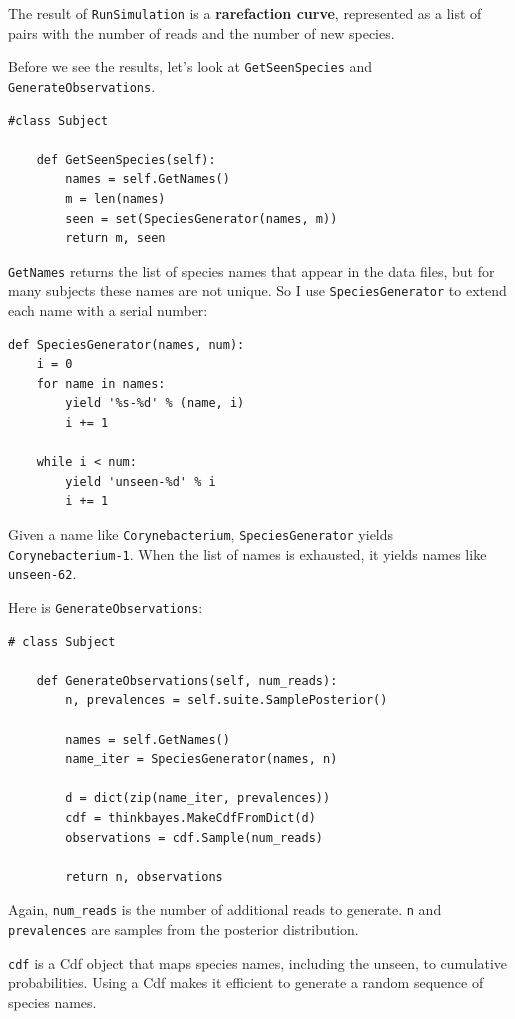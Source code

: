 \documentclass[12pt]{book}
\begin{document}
The result of {\tt RunSimulation} is a {\bf rarefaction curve},
represented as a list of pairs with the number of reads and
the number of new species.

Before we see the results, let's look at {\tt GetSeenSpecies} and
{\tt GenerateObservations}.

\begin{verbatim}
#class Subject

    def GetSeenSpecies(self):
        names = self.GetNames()
        m = len(names)
        seen = set(SpeciesGenerator(names, m))
        return m, seen
\end{verbatim}

{\tt GetNames} returns the list of species names that appear in
the data files, but for many subjects these names are not unique.
So I use {\tt SpeciesGenerator} to extend each name with a serial
number:

\begin{verbatim}
def SpeciesGenerator(names, num):
    i = 0
    for name in names:
        yield '%s-%d' % (name, i)
        i += 1

    while i < num:
        yield 'unseen-%d' % i
        i += 1
\end{verbatim}

Given a name like {\tt Corynebacterium}, {\tt SpeciesGenerator} yields
{\tt Corynebacterium-1}.  When the list of names is exhausted, it
yields names like {\tt unseen-62}.

Here is {\tt GenerateObservations}:

\begin{verbatim}
# class Subject

    def GenerateObservations(self, num_reads):
        n, prevalences = self.suite.SamplePosterior()

        names = self.GetNames()
        name_iter = SpeciesGenerator(names, n)

        d = dict(zip(name_iter, prevalences))
        cdf = thinkbayes.MakeCdfFromDict(d)
        observations = cdf.Sample(num_reads)

        return n, observations
\end{verbatim}

Again, \verb"num_reads" is the number of additional reads
to generate.  {\tt n} and {\tt prevalences} are samples from
the posterior distribution.

{\tt cdf} is a Cdf object that maps species names, including the
unseen, to cumulative probabilities.  Using a Cdf makes it efficient
to generate a random sequence of species names.
\end{document}
